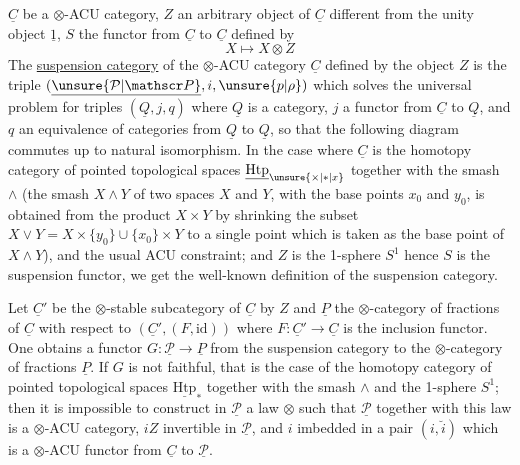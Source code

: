  $\underline C$ be a $\otimes$-ACU category, $Z$ an arbitrary object of $\underline C$ different from the unity object $\underline 1$, $S$ the functor from $\underline C$ to $\underline C$ defined by
\[
X\longmapsto X\otimes Z
\]
The \uline{suspension category} of the $\otimes$-ACU category $\underline C$ defined by the object $Z$ is the triple $(\underline{\unsure{\mathcal P|\mathscr P}},i,\unsure{p|\rho})$ which solves the universal problem for triples $(\underline Q,j,q)$ where $\underline Q$ is a category, $j$ a functor from $\underline C$ to $\underline Q$, and $q$ an equivalence of categories from $\underline Q$ to $\underline Q$, so that the following diagram commutes
up to natural isomorphism. In the case where $\underline C$ is the homotopy category of pointed topological spaces $\underline{\mathrm{Htp}}_{\unsure{\times|\ast|x}}$ together with the smash $\wedge$ (the smash $X\wedge Y$ of two spaces $X$ and $Y$, with the base points $x_0$ and $y_0$, is obtained from the product $X\times Y$ by shrinking the subset $X\vee Y=X\times\{y_0\}\cup\{x_0\}\times Y$ to a single point which is taken as the base point of $X\wedge Y$), and the usual ACU constraint; and $Z$ is the 1-sphere $S^1$ hence $S$ is the suspension functor, we get the well-known definition of the suspension category.

Let $\underline C'$ be the $\otimes$-stable subcategory of $\underline C$  by $Z$ and $\underline P$ the $\otimes$-category of fractions of $\underline C$ with respect to $(\underline C',(F,\mathrm{id}))$ where $F:\underline C'\to\underline C$ is the inclusion functor. One obtains a functor $G:\underline{\mathcal P}\to\underline P$ from the suspension category to the $\otimes$-category of fractions $\underline P$. If $G$ is not faithful, that is the case of the homotopy category of pointed topological spaces $\underline{\mathrm{Htp}}_{\ast}$ together with the smash $\wedge$ and the 1-sphere $S^1$; then it is impossible to construct in $\underline{\mathcal P}$ a law $\otimes$ such that $\underline{\mathcal P}$ together with this law is a $\otimes$-ACU category, $iZ$ invertible in $\underline{\mathcal P}$, and $i$ imbedded in a pair $(i,\breve i)$ which is a $\otimes$-ACU functor from $\underline C$ to $\underline{\mathcal P}$.
